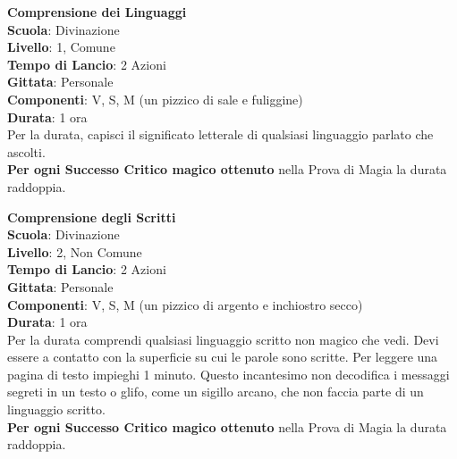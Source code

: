 \begin{multicols}{2}
\medskip\textbf{Comprensione dei Linguaggi}\\
\textbf{Scuola}: Divinazione\\
\textbf{Livello}: 1, Comune\\
\textbf{Tempo di Lancio}: 2 Azioni\\
\textbf{Gittata}: Personale\\
\textbf{Componenti}: V, S, M (un pizzico di sale e fuliggine)\\
\textbf{Durata}: 1 ora\\
Per la durata, capisci il significato letterale di qualsiasi linguaggio parlato che ascolti.\\
\textbf{Per ogni Successo Critico magico ottenuto} nella Prova di Magia la durata raddoppia.

\medskip\textbf{Comprensione degli Scritti}\\
\textbf{Scuola}: Divinazione\\
\textbf{Livello}: 2, Non Comune\\
\textbf{Tempo di Lancio}: 2 Azioni\\
\textbf{Gittata}: Personale\\
\textbf{Componenti}: V, S, M (un pizzico di argento e inchiostro secco)\\
\textbf{Durata}: 1 ora\\
Per la durata comprendi qualsiasi linguaggio scritto non magico che vedi. Devi essere a contatto con la superficie su cui le parole sono scritte. Per leggere una pagina di testo impieghi 1 minuto. Questo incantesimo non decodifica i messaggi segreti in un testo o glifo, come un sigillo arcano, che non faccia parte di un linguaggio scritto.\\
\textbf{Per ogni Successo Critico magico ottenuto} nella Prova di Magia la durata raddoppia.


\end{multicols}
